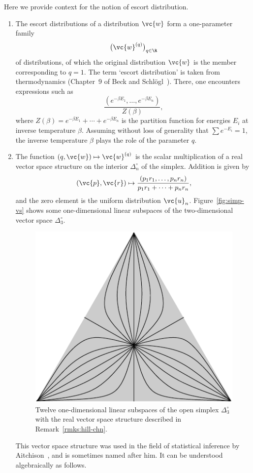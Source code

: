 \begin{remarks}
Here we provide context for the notion of escort distribution.
% 
\begin{enumerate}
\item
The escort distributions of a distribution $\vc{w}$ form a 
one-parameter family
\[
\bigl( \vc{w}^{(q)} \bigr)_{q \in \R}
\]
of distributions, of which the original distribution $\vc{w}$ is the member
corresponding to $q = 1$.  The term `escort distribution' is taken from
thermodynamics (Chapter~9 of Beck and
Schl\"ogl~\cite{BeSc}).  There, one encounters expressions such as
\[
\frac{(e^{-\beta E_1}, \ldots, e^{-\beta E_n})}{Z(\beta)},
\]
where $Z(\beta) = e^{-\beta E_1} + \cdots + e^{-\beta E_n}$ is the
partition%
%
%
function for energies $E_i$ at inverse temperature $\beta$.
Assuming without loss of generality that $\sum e^{-E_i} = 1$, the inverse
temperature $\beta$ plays the role of the parameter $q$.

\item
{}
The function $(q, \vc{w}) \mapsto \vc{w}^{(q)}$ is the scalar
multiplication of a real vector space structure on the interior
$\Delta_n^\circ$ of the simplex.%
%
% 
Addition is given by 
\[
(\vc{p}, \vc{r}) 
\mapsto
\frac{(p_1 r_1, \ldots, p_n r_n)}{p_1 r_1 + \cdots + p_n r_n},
\]
and the zero element is the uniform distribution $\vc{u}_n$.
Figure~\ref{fig:simp-vs} shows some one-dimensional linear subspaces of the
two-dimensional vector space $\Delta_3^\circ$.
% 
\begin{figure}
\centering
\lengths
\includegraphics[width=70\unitlength]{subspaces_quietm}
\caption{Twelve one-dimensional linear subspaces of the open simplex
  $\Delta_3^\circ$ with the real vector space structure described in
  Remark~\ref{rmks:hill-chn}.}
\end{figure}
% 
This vector space structure was used in the field of statistical inference
by Aitchison~\cite{Aitc},%
%
% 
and is sometimes named after him.  It can be understood algebraically as
follows.


\end{enumerate}
\end{remarks}
